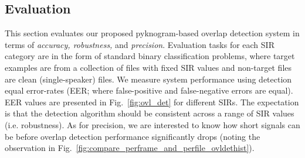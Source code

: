 {\newpage

\subsection{Evaluation}
\label{ssec:exp_pykno}

This section evaluates our proposed pyknogram-based overlap detection system in terms of {\it accuracy, robustness,} and {\it precision}. 
Evaluation tasks for each SIR category are in the form of standard binary classification problems, where target examples are from a collection of files with fixed SIR values and non-target files are clean (single-speaker) files. 
We measure system performance using detection equal error-rates (EER; where false-positive and false-negative errors are equal). 
EER values are presented in Fig.~\ref{fig:ovl_det} for different SIRs. 
The expectation is that the detection algorithm should be consistent across a range of SIR values (i.e. robustness). 
As for precision, we are interested to know how short signals can be before overlap detection performance significantly drops (noting the observation in Fig.~\ref{fig:compare_perframe_and_perfile_ovldethist}). 


\vspace{3mm}
}
